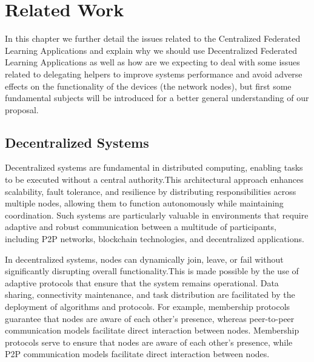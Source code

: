 

\chapter{Related Work}
\label{cha:users_manual}

\glsresetall



In this chapter we further detail the issues related to the Centralized Federated Learning Applications and explain why we should use Decentralized Federated Learning Applications as well as how are we expecting to deal with some issues related to delegating helpers to improve systems performance and avoid adverse effects on the functionality of the devices (the network nodes), but first some fundamental subjects will be introduced for a better general understanding of our proposal.


\section{Decentralized Systems}
\label{sec:decentralised_systems}

Decentralized systems are fundamental in distributed computing, enabling tasks to be executed without a central authority.This architectural approach enhances scalability, fault tolerance, and resilience by distributing responsibilities across multiple nodes, allowing them to function autonomously while maintaining coordination. Such systems are particularly valuable in environments that require adaptive and robust communication between a multitude of participants, including \gls{P2P} networks, blockchain technologies, and decentralized applications.

In decentralized systems, nodes can dynamically join, leave, or fail without significantly disrupting overall functionality.This is made possible by the use of adaptive protocols that ensure that the system remains operational. Data sharing, connectivity maintenance, and task distribution are facilitated by the deployment of algorithms and protocols. For example, membership protocols guarantee that nodes are aware of each other's presence, whereas peer-to-peer communication models facilitate direct interaction between nodes. Membership protocols serve to ensure that nodes are aware of each other's presence, while \gls{P2P} communication models facilitate direct interaction between nodes.

